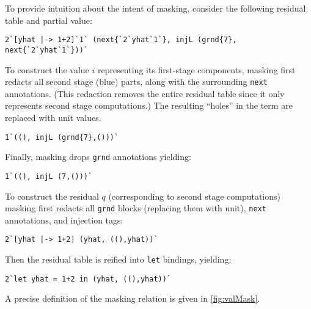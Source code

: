 \begin{abstrsyn}
To provide intuition about the intent of masking, consider the
following residual table and partial value:
\begin{lstlisting}
2`[yhat |-> 1+2]`1` (next{`2`yhat`1`}, injL (grnd{7}, next{`2`yhat`1`}))`
\end{lstlisting}
To construct the value $i$ representing its first-stage components,
masking first redacts all second stage (blue) parts, along with the
surrounding \texttt{next} annotations. (This redaction removes the
entire residual table since it only represents second stage
computations.) The resulting ``holes'' in the term are replaced with
unit values.
\begin{lstlisting}
1`((), injL (grnd{7},()))`
\end{lstlisting}
Finally, masking drops \texttt{grnd} annotations yielding:
\begin{lstlisting}
1`((), injL (7,()))`
\end{lstlisting}
To construct the residual $q$ (corresponding to second stage computations) masking first redacts all \texttt{grnd} blocks
(replacing them with unit), \texttt{next} annotations, and injection tags:
\begin{lstlisting}
2`[yhat |-> 1+2] (yhat, ((),yhat))`
\end{lstlisting}
Then the residual table is reified into \texttt{let} bindings,
yielding:
\begin{lstlisting}
2`let yhat = 1+2 in (yhat, ((),yhat))`
\end{lstlisting}
A precise definition of the masking relation is given in
\ref{fig:valMask}.



\end{abstrsyn}

